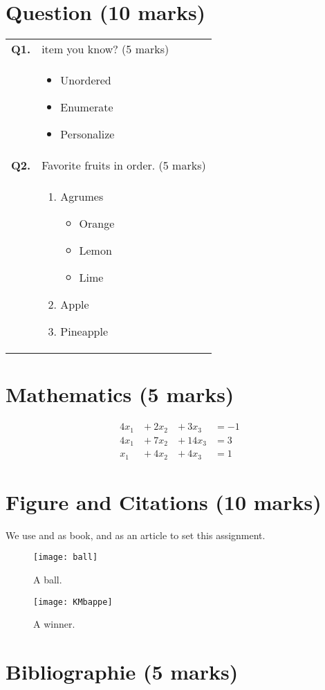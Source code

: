 \documentclass{article}
\begin{document}
\section{Question (10 marks)}

\begin{tabular}{lp{13cm}}
\textbf{Q1.} & item you know? (5 marks) \\
& \begin{itemize}[leftmargin=*]
    \item Unordered
    \item Enumerate
    \item Personalize
\end{itemize} \\[1em]
\textbf{Q2.} & Favorite fruits in order. (5 marks) \\
& \begin{enumerate}[label=(\alph*), leftmargin=*]
    \item Agrumes
    \begin{itemize}
        \item Orange
        \item Lemon
        \item Lime
    \end{itemize}
    \item Apple
    \item Pineapple
\end{enumerate}
\end{tabular}

\section{Mathematics (5 marks)}

\begin{alignat*}{4}
    x_1 & {}+ 2x_2  & {}+ 3x_3  & {}= -1 \\
    4x_1 & {}+ 7x_2  & {}+ 14x_3 & {}= 3 \\
    x_1 & {}+ 4x_2  & {}+ 4x_3  & {}= 1
\end{alignat*}

\section{Figure and Citations (10 marks)}

We use \cite{deb2001multi} and \cite{parija2018thesis} as book, and \cite{datta2013real} as an article to set this assignment.

\begin{figure}[H] 
    \begin{minipage}{0.45\textwidth}
        \centering
        \texttt{[image: ball]}
        \caption{A ball.}
    \end{minipage}
    \hfill
    \begin{minipage}{0.45\textwidth}
        \centering
        \texttt{[image: KMbappe]}
        \caption{A winner.}
    \end{minipage}
\end{figure}


\section{Bibliographie (5 marks)}


\end{document}
